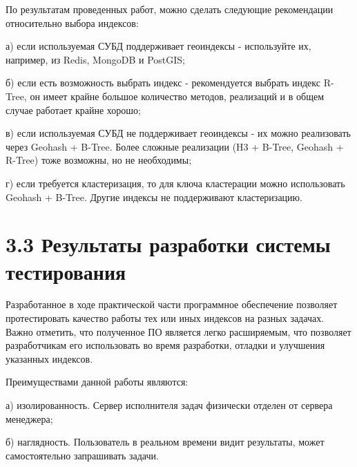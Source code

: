 По результатам проведенных работ, можно сделать следующие рекомендации относительно выбора индексов:
\par а) если используемая СУБД поддерживает геоиндексы - используйте их, например, из Redis, MongoDB и PostGIS;
\par б) если есть возможность выбрать индекс - рекомендуется выбрать индекс R-Tree, он имеет крайне большое количество методов, реализаций и в общем случае работает крайне хорошо;
\par в) если используемая СУБД не поддерживает геоиндексы - их можно реализовать через Geohash + B-Tree. Более сложные реализации (H3 + B-Tree, Geohash + R-Tree) тоже возможны, но не необходимы;
\par г) если требуется кластеризация, то для ключа кластерации можно использовать Geohash + B-Tree. Другие индексы не поддерживают кластеризацию.

\section{3.3 Результаты разработки системы тестирования}
Разработанное в ходе практической части программное обеспечение позволяет протестировать качество работы тех или иных индексов на разных задачах. Важно отметить, что полученное ПО является легко расширяемым, что позволяет разработчикам его использовать во время разработки, отладки и улучшения указанных индексов.

Преимуществами данной работы являются:
\par а) изолированность. Сервер исполнителя задач физически отделен от сервера менеджера;
\par б) наглядность. Пользователь в реальном времени видит результаты, может самостоятельно запрашивать задачи. 